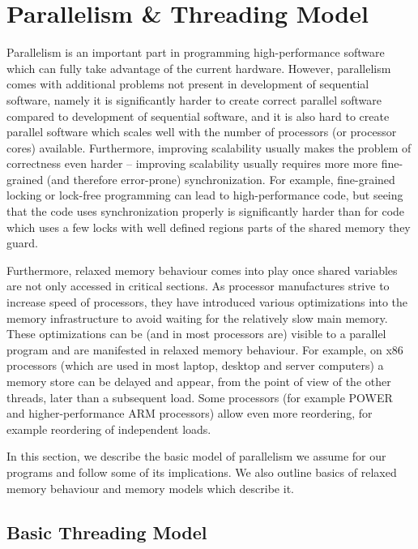 \section{Parallelism \& Threading Model} %

Parallelism is an important part in programming high-performance software which
can fully take advantage of the current hardware.
However, parallelism comes with additional problems not present in development
of sequential software, namely it is significantly harder to create correct
parallel software compared to development of sequential software, and it is also
hard to create parallel software which scales well with the number of processors
(or processor cores) available.
Furthermore, improving scalability usually makes the problem of correctness even
harder -- improving scalability usually requires more more fine-grained (and
therefore error-prone) synchronization.
For example, fine-grained locking or lock-free programming can lead to
high-performance code, but seeing that the code uses synchronization properly
is significantly harder than for code which uses a few locks with well defined
regions parts of the shared memory they guard.

Furthermore, relaxed memory behaviour comes into play once shared variables are
not only accessed in critical sections.
As processor manufactures strive to increase speed of processors, they have
introduced various optimizations into the memory infrastructure to avoid
waiting for the relatively slow main memory.
These optimizations can be (and in most processors are) visible to a parallel
program and are manifested in relaxed memory behaviour.
For example, on x86 processors (which are used in most laptop, desktop and
server computers) a memory store can be delayed and appear, from the point of
view of the other threads, later than a subsequent load.
Some processors (for example POWER and higher-performance ARM processors) allow
even more reordering, for example reordering of independent loads.

In this section, we describe the basic model of parallelism we assume for our
programs and follow some of its implications.
We also outline basics of relaxed memory behaviour and memory models
which describe it.

\subsection{Basic Threading Model}

